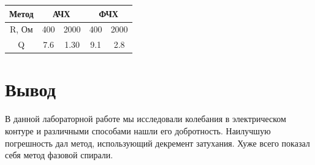 \documentclass[a4paper]{article}
\begin{document}
\begin{table}[h!]
    \centering
\begin{tabular}{|c|cc|cc|}
\hline
Метод    & \multicolumn{2}{c|}{АЧХ}        & \multicolumn{2}{c|}{ФЧХ}        \\ \hline
R, Ом    & \multicolumn{1}{c|}{400} & 2000 & \multicolumn{1}{c|}{400} & 2000 \\ \hline
Q        & \multicolumn{1}{c|}{7.6} & 1.30 & \multicolumn{1}{c|}{9.1} & 2.8  \\ \hline
\end{tabular}
\end{table}

\section{Вывод}

В данной лабораторной работе мы исследовали колебания в электрическом контуре и 
различными способами нашли его добротность. Наилучшую погрешность дал метод, 
использующий декремент затухания. Хуже всего показал себя метод фазовой спирали.
\end{document}
